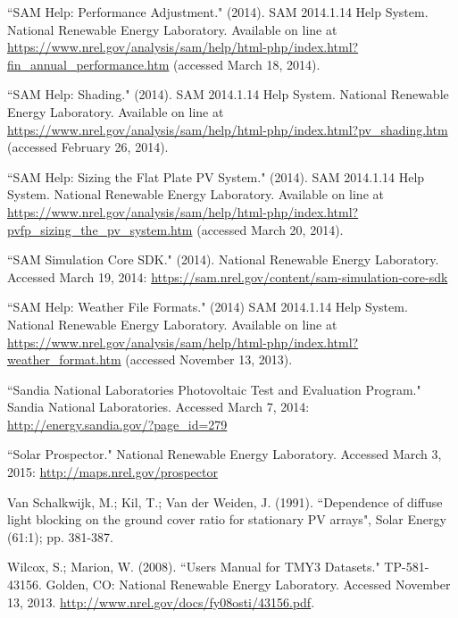 \documentclass[12pt,letterpaper]{article}
\begin{document}
\begin{thebibliography}{99}
 ``SAM Help: Performance Adjustment." (2014). SAM 2014.1.14 Help System. National Renewable Energy Laboratory. Available on line at \url{https://www.nrel.gov/analysis/sam/help/html-php/index.html?fin_annual_performance.htm} (accessed March 18, 2014).

 ``SAM Help: Shading." (2014). SAM 2014.1.14 Help System. National Renewable Energy Laboratory. Available on line at \url{https://www.nrel.gov/analysis/sam/help/html-php/index.html?pv_shading.htm} (accessed February 26, 2014).

 ``SAM Help: Sizing the Flat Plate PV System." (2014). SAM 2014.1.14 Help System. National Renewable Energy Laboratory. Available on line at \url{https://www.nrel.gov/analysis/sam/help/html-php/index.html?pvfp\_sizing\_the\_pv\_system.htm} (accessed March 20, 2014).

 ``SAM Simulation Core SDK." (2014). National Renewable Energy Laboratory. Accessed March 19, 2014: \url{https://sam.nrel.gov/content/sam-simulation-core-sdk}

 ``SAM Help: Weather File Formats." (2014) SAM 2014.1.14 Help System. National Renewable Energy Laboratory. Available on line at  \url{https://www.nrel.gov/analysis/sam/help/html-php/index.html?weather_format.htm} (accessed November 13, 2013).

 ``Sandia National Laboratories Photovoltaic Test and Evaluation Program." Sandia National Laboratories. Accessed March 7, 2014: \url{http://energy.sandia.gov/?page_id=279}

``Solar Prospector." National Renewable Energy Laboratory. Accessed March 3, 2015: \url{http://maps.nrel.gov/prospector}

 Van Schalkwijk, M.; Kil, T.; Van der Weiden, J. (1991). ``Dependence of diffuse light blocking on the ground cover ratio for stationary PV arrays", Solar Energy (61:1); pp. 381-387.

 Wilcox, S.; Marion, W. (2008). ``Users Manual for TMY3 Datasets." TP-581-43156. Golden, CO: National Renewable Energy Laboratory. Accessed November 13, 2013. \url{http://www.nrel.gov/docs/fy08osti/43156.pdf}.

\end{thebibliography}
\end{document}
